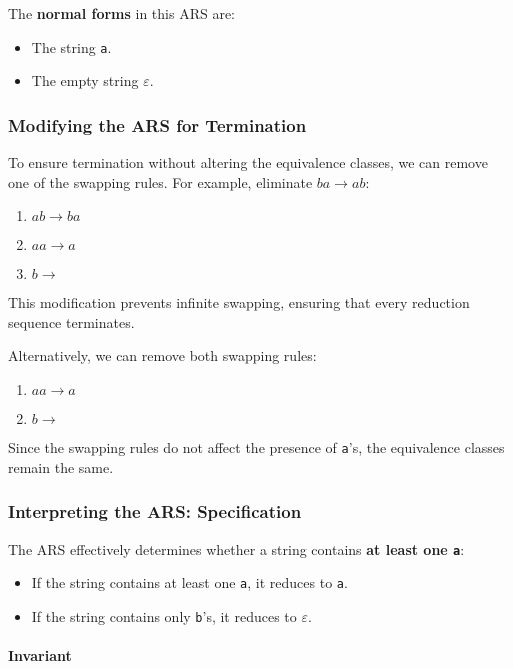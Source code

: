 \documentclass{article}
\begin{document}
The \textbf{normal forms} in this ARS are:

\begin{itemize}
    \item The string \texttt{a}.
    \item The empty string $\varepsilon$.
\end{itemize}

\subsubsection*{Modifying the ARS for Termination}

To ensure termination without altering the equivalence classes, we can remove one of the swapping rules. For example, eliminate $ba \to ab$:

\begin{enumerate}
    \item $ab \to ba$
    \item $aa \to a$
    \item $b \to$
\end{enumerate}

This modification prevents infinite swapping, ensuring that every reduction sequence terminates.

Alternatively, we can remove both swapping rules:

\begin{enumerate}
    \item $aa \to a$
    \item $b \to$
\end{enumerate}

Since the swapping rules do not affect the presence of \texttt{a}'s, the equivalence classes remain the same.

\subsubsection*{Interpreting the ARS: Specification}

The ARS effectively determines whether a string contains \textbf{at least one \texttt{a}}:

\begin{itemize}
    \item If the string contains at least one \texttt{a}, it reduces to \texttt{a}.
    \item If the string contains only \texttt{b}'s, it reduces to $\varepsilon$.
\end{itemize}

\paragraph{Invariant}
\end{document}
